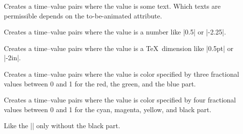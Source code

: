 \begin{command}{\pgfsysanimvaltext{}}
\end{command}
\begin{command}{\pgfsys@animation@val@text{}}
    Creates a time--value pairs where the value is some text. Which texts are
    permissible depends on the to-be-animated attribute.
\end{command}

\begin{command}{\pgfsysanimvalscalar{}}
\end{command}
\begin{command}{\pgfsys@animation@val@scalar{}}
    Creates a time--value pairs where the value is a number like |0.5| or
    |-2.25|.
\end{command}

\begin{command}{\pgfsysanimvaldimension{}}
\end{command}
\begin{command}{\pgfsys@animation@val@dimension{}}
    Creates a time--value pairs where the value is a \TeX\ dimension like
    |0.5pt| or |-2in|.
\end{command}

\begin{command}{\pgfsysanimvalcolorrgb{}}
\end{command}
\begin{command}{\pgfsys@animation@val@color@rgb{}}
    Creates a time--value pairs where the value is color specified by three
    fractional values between 0 and 1 for the red, the green, and the blue
    part.
\end{command}

\begin{command}{\pgfsysanimvalcolorcmyk{}}
\end{command}
\begin{command}{\pgfsys@animation@val@color@cmyk{}}
    Creates a time--value pairs where the value is color specified by four
    fractional values between 0 and 1 for the cyan, magenta, yellow, and black
    part.
\end{command}

\begin{command}{\pgfsysanimvalcolorcmy{}}
\end{command}
\begin{command}{\pgfsys@animation@val@color@cmy{}}
    Like the |\pgfsysanimvalcolorcmyk| only without the black part.
\end{command}

